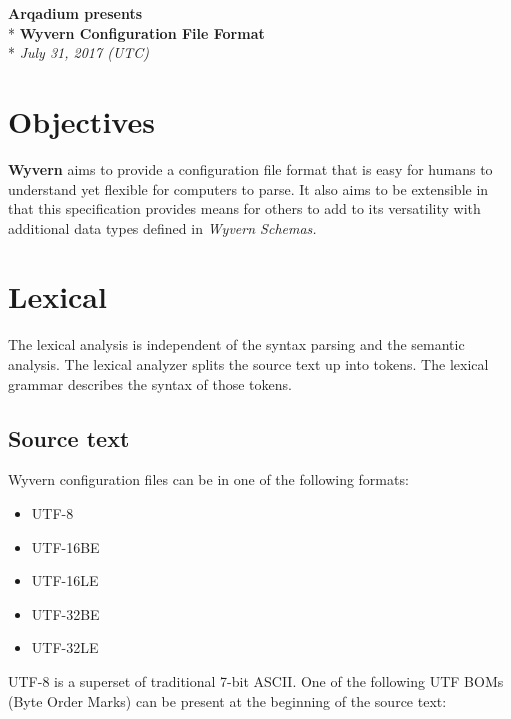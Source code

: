 \documentclass[12pt,english]{article}
\begin{document}
\begin{center}

\vspace*{9cm}

\Large{\textbf{Arqadium presents}} \\*
\vspace*{0.25cm}
\Huge{\textbf{Wyvern Configuration File Format}} \\*
\vspace*{1cm}
\large{\textit{July 31, 2017 (UTC)}}
\end{center}

\clearpage{}

\tableofcontents{}

\clearpage{}

\section{Objectives}

\textbf{Wyvern} aims to provide a configuration file format that is easy for
humans to understand yet flexible for computers to parse. It also aims to be
extensible in that this specification provides means for others to add to its
versatility with additional data types defined in \textit{Wyvern Schemas.}

\section{Lexical}

The lexical analysis is independent of the syntax parsing and the semantic
analysis. The lexical analyzer splits the source text up into tokens. The
lexical grammar describes the syntax of those tokens.

\subsection{Source text}

Wyvern configuration files can be in one of the following formats:

\begin{itemize}
\item UTF-8
\item UTF-16BE
\item UTF-16LE
\item UTF-32BE
\item UTF-32LE
\end{itemize}

UTF-8 is a superset of traditional 7-bit ASCII. One of the following UTF BOMs
(Byte Order Marks) can be present at the beginning of the source text:
\end{document}
